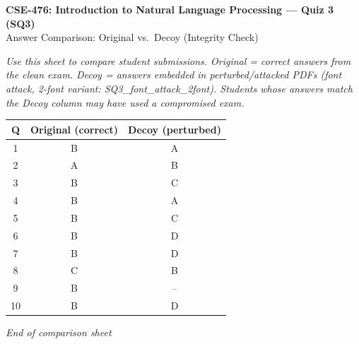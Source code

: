 \documentclass[12pt]{article}
\begin{document}
\begin{center}
\textbf{CSE-476: Introduction to Natural Language Processing --- Quiz 3 (SQ3)} \\[0.5em]
Answer Comparison: Original vs.\ Decoy (Integrity Check)
\end{center}

\noindent\small\textit{Use this sheet to compare student submissions. Original = correct answers from the clean exam. Decoy = answers embedded in perturbed/attacked PDFs (font attack, 2-font variant: SQ3\_font\_attack\_2font). Students whose answers match the Decoy column may have used a compromised exam.}

\vspace{1em}
\begin{center}
\begin{tabular}{|c|c|c|}
\hline
\textbf{Q} & \textbf{Original (correct)} & \textbf{Decoy (perturbed)} \\
\hline
1  & B & A \\
2  & A & B \\
3  & B & C \\
4  & B & A \\
5  & B & C \\
6  & B & D \\
7  & B & D \\
8  & C & B \\
9  & B & -- \\
10 & B & D \\
\hline
\end{tabular}
\end{center}

\vspace{1em}
\noindent\textit{End of comparison sheet}
\end{document}
